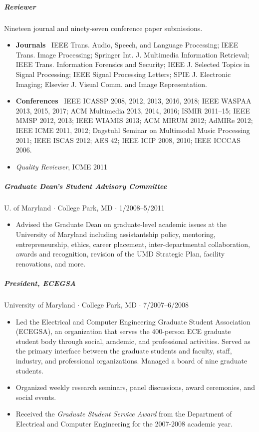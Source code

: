 \documentclass[10pt,letterpaper]{article}
\begin{document}
\subparagraph{Reviewer} Nineteen journal and ninety-seven conference paper submissions. 
\begin{itemize}
    \item \textbf{Journals} \ 
        IEEE Trans. Audio, Speech, and Language Processing;
        IEEE Trans. Image Processing; %
        Springer Int. J. Multimedia Information Retrieval; %
        IEEE Trans. Information Forensics and Security; %
        IEEE J. Selected Topics in Signal Processing; %
        IEEE Signal Processing Letters; %
        SPIE J. Electronic Imaging; %
        Elsevier J. Visual Comm. and Image Representation. %
    \item \textbf{Conferences} \ 
        IEEE ICASSP 2008, 2012, 2013, 2016, 2018; %
        IEEE WASPAA 2013, 2015, 2017; %
        ACM Multimedia 2013, 2014, 2016; %
        ISMIR 2011--15; %
        IEEE MMSP 2012, 2013; %
        IEEE WIAMIS 2013; %
        ACM MIRUM 2012; %
        AdMIRe 2012; %
        IEEE ICME 2011, 2012; %
        Dagstuhl Seminar on Multimodal Music Processing 2011; %
        IEEE ISCAS 2012; %
        AES 42; %
        IEEE ICIP 2008, 2010; %
        IEEE ICCCAS 2006. %
    \item \textit{Quality Reviewer}, ICME 2011
\end{itemize}

\subparagraph{Graduate Dean's Student Advisory Committee}
U. of Maryland $\cdot$ College Park, MD $\cdot$ 1/2008--5/2011
\begin{itemize}
    \item Advised the Graduate Dean on graduate-level academic issues at the University of Maryland including assistantship policy, mentoring, entrepreneurship, ethics, career placement, inter-departmental collaboration, awards and recognition, revision of the UMD Strategic Plan, facility renovations, and more.
\end{itemize}

\subparagraph{President, ECEGSA}
University of Maryland $\cdot$ College Park, MD $\cdot$ 7/2007--6/2008
\begin{itemize}
    \item Led the Electrical and Computer Engineering Graduate Student Association (ECEGSA), an organization that serves the 400-person ECE graduate student body through social, academic, and professional activities.  Served as the primary interface between the graduate students and faculty, staff, industry, and professional organizations.  Managed a board of nine graduate students. 
    \item Organized weekly research seminars, panel discussions, award ceremonies,  and social events.
    \item Received the \textit{Graduate Student Service Award} from the Department of Electrical and Computer Engineering for the 2007-2008 academic year.
\end{itemize}
\end{document}

